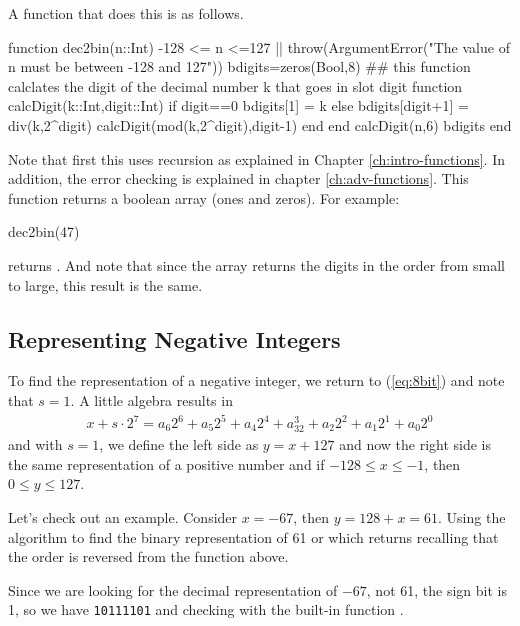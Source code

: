 A function that does this is as follows.  


\begin{jlblock}
function dec2bin(n::Int)
  -128 <= n <=127 || throw(ArgumentError("The value of n must be between -128 and 127"))
  bdigits=zeros(Bool,8)
  ## this function calclates the digit of the decimal number k that goes in slot digit
  function calcDigit(k::Int,digit::Int)
    if digit==0
      bdigits[1] = k
    else 
      bdigits[digit+1] = div(k,2^digit)
      calcDigit(mod(k,2^digit),digit-1)
    end
  end
  calcDigit(n,6)
  bdigits
end
\end{jlblock}

Note that first this uses recursion as explained in Chapter \ref{ch:intro-functions}.  In addition, the error checking is explained in chapter \ref{ch:adv-functions}.  This function returns a boolean array (ones and zeros).  For example:
\begin{jlblock}
dec2bin(47)
\end{jlblock}
%
returns  \printpythontex[verbatim].  And note that since the array returns the digits in the order from small to large, this result is the same.  


\subsection{Representing Negative Integers}

To find the representation of a negative integer, we return to (\ref{eq:8bit}) and note that $s=1$.  A little algebra results in 
\begin{align*}
x+s \cdot 2^7 =  a_6 2^6 + a_5 2^5 + a_4 2^4 + a_32^3 + a_2 2^2 + a_1 2^1 + a_0 2^0
\end{align*}
and with $s=1$, we define the left side as $y=x+127$ and now the right side is the same representation of a positive number and if $-128 \leq x \leq -1$, then $0 \leq y \leq 127$.  

Let's check out an example.  Consider $x=-67$, then $y=128+x=61$.  Using the algorithm to find the binary representation of 61 or  which returns  \printpythontex[verbatim] recalling that the order is reversed from the function above. 

Since we are looking for the decimal representation of $-67$, not 61, the sign bit is 1, so we have \verb!10111101! and checking with the built-in function   \printpythontex[verb]. 

